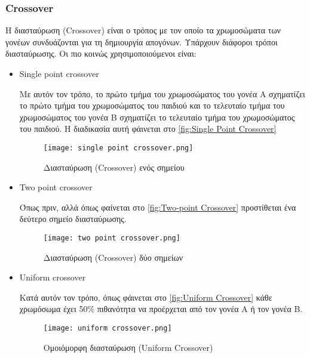 \subsubsection{\textlatin{Crossover}}

Η διασταύρωση (\textlatin{Crossover}) είναι ο τρόπος με τον οποίο τα χρωμοσώματα των γονέων συνδυάζονται για
τη δημιουργία απογόνων. Υπάρχουν διάφοροι τρόποι διασταύρωσης. Οι πιο
κοινώς χρησιμοποιούμενοι είναι:
\begin{samepage}
\begin{itemize}
\item
\textlatin{Single point crossover}

Με αυτόν τον τρόπο, το πρώτο τμήμα του χρωμοσώματος του γονέα A σχηματίζει το πρώτο τμήμα του χρωμοσώματος του παιδιού και το τελευταίο τμήμα του χρωμοσώματος του γονέα B σχηματίζει το τελευταίο τμήμα του χρωμοσώματος του παιδιού. Η διαδικασία αυτή φάινεται στο \autoref{fig:Single Point Crossover}


\begin{figure}[H]
    \centering
    \texttt{[image: single point crossover.png]}
    \caption{Διασταύρωση \textlatin{(Crossover)} ενός σημείου \cite{kochenderfer2019}}
    \label{fig:Single Point Crossover}


\end{figure}


\item
\textlatin{Two point crossover}

Όπως πριν, αλλά όπως φαίνεται στο \autoref{fig:Two-point Crossover} προστίθεται ένα δεύτερο σημείο διασταύρωσης.


\begin{figure}[H]
    \centering
    \texttt{[image: two point crossover.png]}
    \caption{Διασταύρωση \textlatin{(Crossover)} δύο σημείων \cite{kochenderfer2019}}
    \label{fig:Two-point Crossover}


\end{figure}

\item
\textlatin{Uniform crossover}

Κατά αυτόν τον τρόπο, όπως φάινεται στο \autoref{fig:Uniform Crossover} κάθε χρωμόσωμα έχει 50\% πιθανότητα να προέρχεται από τον γονέα A ή τον γονέα B.

\begin{figure}[H]
    \centering
    \texttt{[image: uniform crossover.png]}
    \caption{Ομοιόμορφη διασταύρωση \textlatin{(Uniform Crossover) \cite{kochenderfer2019}}}
    \label{fig:Uniform Crossover}

\end{figure}
\end{itemize}
\end{samepage}

